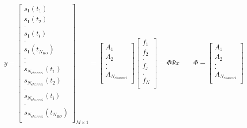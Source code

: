 \documentclass[10pt]{amsart}
\begin{document}
\[
y = 
\begin{bmatrix}
s_1(t_1) \\
s_1(t_2) \\
    .    \\
s_1(t_i) \\
    .    \\
s_1(t_{N_{RO}}) \\
    .    \\
    .    \\
s_{N_{channel}}(t_1) \\
s_{N_{channel}}(t_2) \\
    .    \\
s_{N_{channel}}(t_i) \\
    .    \\
s_{N_{channel}}(t_{N_{RO}}) \\
\end{bmatrix}_{M \times 1}
= 
\begin{bmatrix}
A_1 \\
A_2 \\
 .  \\
 .  \\
A_{N_{channel}} \\
\end{bmatrix}
\begin{bmatrix}
f_1 \\
f_2 \\
  . \\
f_j \\
  . \\
f_N \\
\end{bmatrix}
=
\Phi \Psi x
\qquad
\Phi 
\equiv
\begin{bmatrix}
A_1 \\
A_2 \\
 .  \\
 .  \\
A_{N_{channel}} \\
\end{bmatrix}
\]
\end{document}
